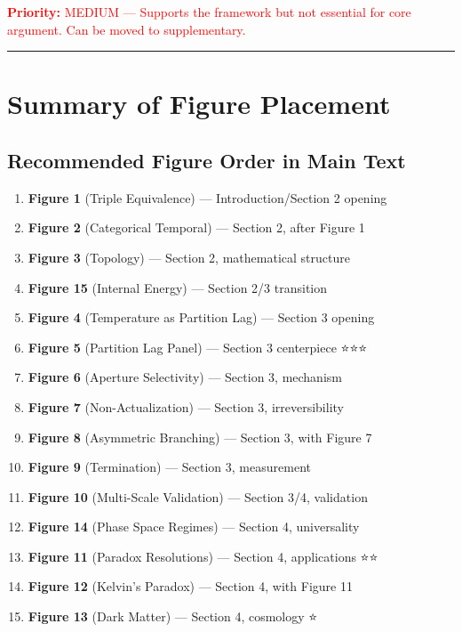 \documentclass[11pt,letterpaper]{article}
\newcommand{\priority}[1]{\textcolor{red}{\textbf{Priority:} #1}}
\begin{document}
\priority{MEDIUM — Supports the framework but not essential for core argument. Can be moved to supplementary.}

\vspace{1cm}
\hrule
\vspace{1cm}

\section{Summary of Figure Placement}

\subsection{Recommended Figure Order in Main Text}

\begin{enumerate}
    \item \textbf{Figure 1} (Triple Equivalence) — Introduction/Section 2 opening
    \item \textbf{Figure 2} (Categorical Temporal) — Section 2, after Figure 1
    \item \textbf{Figure 3} (Topology) — Section 2, mathematical structure
    \item \textbf{Figure 15} (Internal Energy) — Section 2/3 transition
    \item \textbf{Figure 4} (Temperature as Partition Lag) — Section 3 opening
    \item \textbf{Figure 5} (Partition Lag Panel) — Section 3 centerpiece ⭐⭐⭐
    \item \textbf{Figure 6} (Aperture Selectivity) — Section 3, mechanism
    \item \textbf{Figure 7} (Non-Actualization) — Section 3, irreversibility
    \item \textbf{Figure 8} (Asymmetric Branching) — Section 3, with Figure 7
    \item \textbf{Figure 9} (Termination) — Section 3, measurement
    \item \textbf{Figure 10} (Multi-Scale Validation) — Section 3/4, validation
    \item \textbf{Figure 14} (Phase Space Regimes) — Section 4, universality
    \item \textbf{Figure 11} (Paradox Resolutions) — Section 4, applications ⭐⭐
    \item \textbf{Figure 12} (Kelvin's Paradox) — Section 4, with Figure 11
    \item \textbf{Figure 13} (Dark Matter) — Section 4, cosmology ⭐
\end{enumerate}
\end{document}
